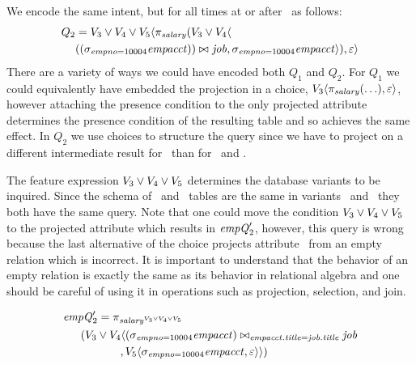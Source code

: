 We encode the same intent, but for all times at or after \vThree\ as follows:
%
\begin{align*}
Q_2 &=  \vThree\vee\vFour\vee\vFive \langle \pi_\salary 
 (\vThree\vee\vFour\langle\\
&    \joinRelR{(\vSel[\empno=10004]{\empacct})}{\job}
             {}, 
{\vSel[\empno=10004]{\empacct}}\rangle), \empRel\rangle
\end{align*}
%
There are a variety of ways we could have encoded both $Q_1$ and $Q_2$.
%
For $Q_1$ we could equivalently have embedded the projection in a choice,
$\chc[\vThree]{\vPrj[\salary]{(\ldots)},\empRel}$, however attaching the presence
condition to the only projected attribute determines the presence condition of
the resulting table and so achieves the same effect.
%
In $Q_2$ we use choices to structure the query since we have to project on a
different intermediate result for \vFive\ than for \vThree\ and \vFour.

 The feature expression $\vThree \vee \vFour \vee \vFive$
 determines the database variants to be inquired. 
 Since the schema of \empacct\ and \job\ tables are the same
 in variants \vThree\ and \vFour\ they both have the same 
 query. Note that one could move the condition 
 $\vThree \vee \vFour \vee \vFive$ to the projected attribute
 which results in $\VVal {\eq_2}$, however, this query is wrong 
 because the last alternative of the choice projects attribute \salary\
 from an empty relation which is incorrect. It is important to 
 understand that the behavior of an empty relation is exactly the
 same as its behavior in relational algebra and one
 should be careful of using it in operations such as projection,
 selection, and join.

 \begin{align*}
 \small
 \VVal {\eq_2} &= 
 \pi_{\oatt \salary {\vThree \vee \vFour \vee \vFive}}\\
 &\hspace{-15pt}
 (\vThree \vee \vFour\langle
 (\sigma_{\empno=10004} \empacct)
 \bowtie_{\empacct . \titleatt = \job . \titleatt}
 \job\\
 &\hspace{20pt},
 \vFive\langle{\selectRel {\empno=10004} \empacct},
 \empRel
 \rangle
 \rangle)
 \end{align*}

